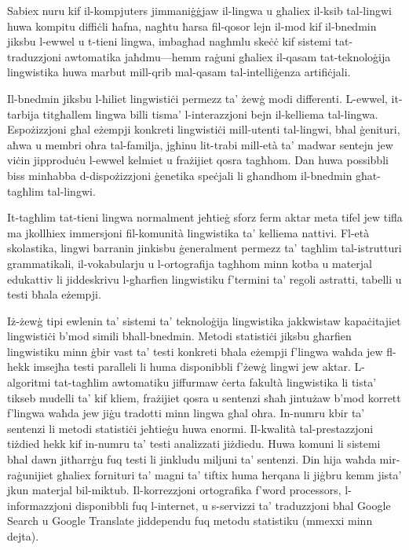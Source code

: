 \documentclass[]{../../metanetpaper}
\begin{document}
\begin{multicols}{2}
Sabiex nuru kif il-kompjuters jimmaniġġjaw il-lingwa u għaliex il-ksib tal-lingwi huwa kompitu diffiċli ħafna, nagħtu ħarsa fil-qosor lejn il-mod kif il-bnedmin jiksbu l-ewwel u t-tieni lingwa, imbagħad nagħmlu skeċċ kif sistemi tat-traduzzjoni awtomatika jaħdmu—hemm raġuni għaliex il-qasam tat-teknoloġija lingwistika huwa marbut mill-qrib mal-qasam tal-intelliġenza artifiċjali.
   
Il-bnedmin jiksbu l-ħiliet lingwistiċi permezz ta’ żewġ modi differenti. L-ewwel, it-tarbija titgħallem lingwa billi tisma’ l-interazzjoni bejn il-kelliema tal-lingwa. Espożizzjoni għal eżempji konkreti lingwistiċi mill-utenti tal-lingwi, bħal ġenituri, aħwa u membri oħra tal-familja, jgħinu lit-trabi mill-età ta’ madwar sentejn jew viċin jipproduċu l-ewwel kelmiet u frażijiet qosra tagħhom. Dan huwa possibbli biss minħabba d-dispożizzjoni ġenetika speċjali li għandhom il-bnedmin għat-tagħlim tal-lingwi.
   
It-tagħlim tat-tieni lingwa normalment jeħtieġ sforz ferm aktar meta tifel jew tifla ma jkollhiex immersjoni fil-komunità lingwistika ta’ kelliema nattivi. Fl-età skolastika, lingwi barranin jinkisbu ġeneralment permezz ta’ tagħlim tal-istrutturi grammatikali, il-vokabularju u l-ortografija tagħhom minn kotba u materjal edukattiv li jiddeskrivu l-għarfien lingwistiku f'termini ta' regoli astratti, tabelli u testi bħala eżempji. 

   
Iż-żewġ tipi ewlenin ta’ sistemi ta’ teknoloġija lingwistika jakkwistaw kapaċitajiet lingwistiċi b’mod simili bħall-bnedmin. Metodi statistiċi jiksbu għarfien lingwistiku minn ġbir vast ta’ testi konkreti bħala eżempji f'lingwa waħda jew fl-hekk imsejħa testi paralleli li huma disponibbli f’żewġ lingwi jew aktar. L-algoritmi tat-tagħlim awtomatiku jiffurmaw ċerta  fakultà lingwistika li tista’ tikseb mudelli ta’ kif kliem, frażijiet qosra u sentenzi sħaħ jintużaw b’mod korrett f'lingwa waħda jew jiġu tradotti minn lingwa għal oħra. In-numru kbir ta’ sentenzi li metodi statistiċi jeħtieġu huwa enormi. Il-kwalità tal-prestazzjoni tiżdied hekk kif in-numru ta’ testi analizzati jiżdiedu. Huwa komuni li sistemi bħal dawn jitħarrġu fuq testi li jinkludu miljuni ta’ sentenzi. Din hija waħda mir-raġunijiet għaliex fornituri ta’ magni ta’ tiftix huma ħerqana li jiġbru kemm jista’ jkun materjal bil-miktub. Il-korrezzjoni ortografika f’word processors, l-informazzjoni disponibbli fuq l-internet, u s-servizzi ta’ traduzzjoni bħal Google Search u Google Translate jiddependu fuq metodu statistiku (mmexxi minn dejta).


\end{multicols}
\end{document}
